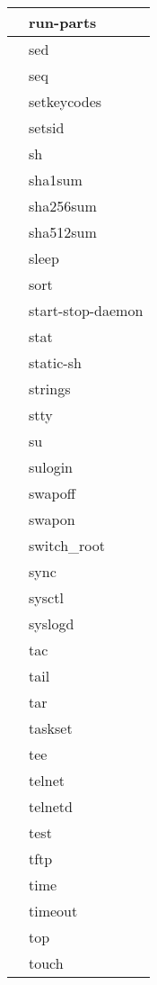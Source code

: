 \begin{longtable}{p{100mm}p{100mm}}
     \hline
      & run-parts \\
     \hline
      & sed \\
     \hline
      & seq \\
     \hline
      & setkeycodes \\
     \hline
      & setsid \\
     \hline
      & sh \\
     \hline
      & sha1sum \\
     \hline
      & sha256sum \\
     \hline
      & sha512sum \\
     \hline
      & sleep \\
     \hline
      & sort \\
     \hline
      & start-stop-daemon \\
     \hline
      & stat \\
     \hline
      & static-sh \\
     \hline
      & strings \\
     \hline
      & stty \\
     \hline
      & su \\
     \hline
      & sulogin \\
     \hline
      & swapoff \\
     \hline
      & swapon \\
     \hline
      & switch\_root \\
     \hline
      & sync \\
     \hline
      & sysctl \\
     \hline
      & syslogd \\
     \hline
      & tac \\
     \hline
      & tail \\
     \hline
      & tar \\
     \hline
      & taskset \\
     \hline
      & tee \\
     \hline
      & telnet \\
     \hline
      & telnetd \\
     \hline
      & test \\
     \hline
      & tftp \\
     \hline
      & time \\
     \hline
      & timeout \\
     \hline
      & top \\
     \hline
      & touch \\
     \hline

\end{longtable}
